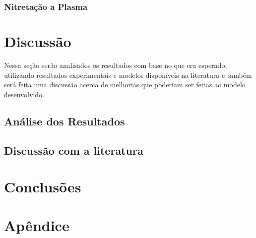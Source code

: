 \documentclass[]{politex}
\begin{document}
\subsection{Nitretação a Plasma}
\label{sec:modelo23}


\chapter{Discussão}
Nessa seção serão analisados os resultados com base no que era esperado, utilizando resultados experimentais e modelos disponíveis na literatura e também será feita uma discussão acerca de melhorias que poderiam ser feitas ao modelo desenvolvido.

\section{Análise dos Resultados}


\section{Discussão com a literatura}
\label{sec:discussao}


\chapter{Conclusões}







\chapter*{Apêndice}


\end{document}
